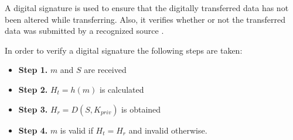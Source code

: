 		A digital signature is used to ensure that the digitally transferred data has not been altered while transferring. Also, it verifies whether or not the transferred data was submitted by a recognized source \cite{katz2010digital}.\\

		\begin{defn}
			In order to verify a digital signature the following steps are taken:
			\begin{itemize}
				\item \textbf{Step 1.} $m$ and $S$ are received
				\item \textbf{Step 2.} $H_t = h(m)$ is calculated
				\item \textbf{Step 3.} $H_r = D(S,K_{priv})$ is obtained
				\item \textbf{Step 4.} $m$ is valid if $H_t = H_r$ and invalid otherwise.
			\end{itemize}
		\label{dfn:signature_verification}
		\end{defn}

